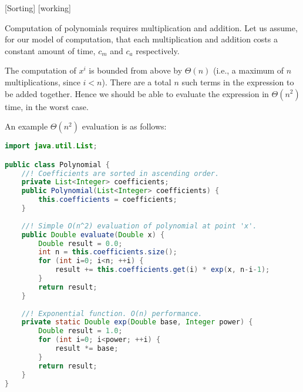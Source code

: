 \documentclass[a4paper,12pt]{article}
\begin{document}
[Sorting] [working]

\vspace{5mm}


Computation of polynomials requires multiplication and addition. Let us assume, for our model of computation, that each multiplication and addition costs a constant amount of time, $c_m$ and $c_a$ respectively. 

The computation of $x^i$ is bounded from above by $\Theta(n)$  (i.e., a maximum of $n$ multiplications, since $i < n$). There are a total $n$ such terms in the expression to be added together. Hence we should
be able to evaluate the expression in $\Theta(n^2)$ time, in the worst case. 

An example $\Theta(n^2)$ evaluation is as follows:

\begin{lstlisting}[language=Java]
import java.util.List;

public class Polynomial {
    //! Coefficients are sorted in ascending order.
    private List<Integer> coefficients;
    public Polynomial(List<Integer> coefficients) {
        this.coefficients = coefficients;
    }
    
    //! Simple O(n^2) evaluation of polynomial at point 'x'.
    public Double evaluate(Double x) {
        Double result = 0.0;
        int n = this.coefficients.size();
        for (int i=0; i<n; ++i) {
            result += this.coefficients.get(i) * exp(x, n-i-1);
        }
        return result;
    }
    
    //! Exponential function. O(n) performance.
    private static Double exp(Double base, Integer power) {
        Double result = 1.0;
        for (int i=0; i<power; ++i) {
            result *= base;
        }
        return result;
    }
}

\end{lstlisting}
\end{document}
